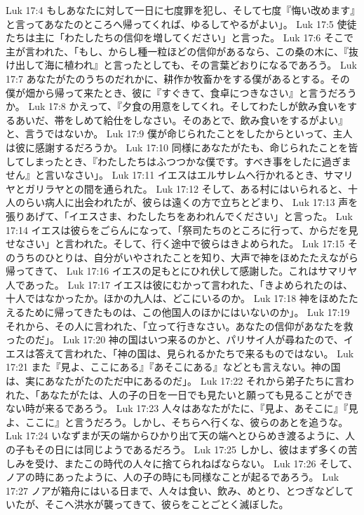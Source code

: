 Luk 17:4  もしあなたに対して一日に七度罪を犯し、そして七度『悔い改めます』と言ってあなたのところへ帰ってくれば、ゆるしてやるがよい」。
Luk 17:5  使徒たちは主に「わたしたちの信仰を増してください」と言った。
Luk 17:6  そこで主が言われた、「もし、からし種一粒ほどの信仰があるなら、この桑の木に、『抜け出して海に植われ』と言ったとしても、その言葉どおりになるであろう。
Luk 17:7  あなたがたのうちのだれかに、耕作か牧畜かをする僕があるとする。その僕が畑から帰って来たとき、彼に『すぐきて、食卓につきなさい』と言うだろうか。
Luk 17:8  かえって、『夕食の用意をしてくれ。そしてわたしが飲み食いをするあいだ、帯をしめて給仕をしなさい。そのあとで、飲み食いをするがよい』と、言うではないか。
Luk 17:9  僕が命じられたことをしたからといって、主人は彼に感謝するだろうか。
Luk 17:10  同様にあなたがたも、命じられたことを皆してしまったとき、『わたしたちはふつつかな僕です。すべき事をしたに過ぎません』と言いなさい」。
Luk 17:11  イエスはエルサレムへ行かれるとき、サマリヤとガリラヤとの間を通られた。
Luk 17:12  そして、ある村にはいられると、十人のらい病人に出会われたが、彼らは遠くの方で立ちとどまり、
Luk 17:13  声を張りあげて、「イエスさま、わたしたちをあわれんでください」と言った。
Luk 17:14  イエスは彼らをごらんになって、「祭司たちのところに行って、からだを見せなさい」と言われた。そして、行く途中で彼らはきよめられた。
Luk 17:15  そのうちのひとりは、自分がいやされたことを知り、大声で神をほめたたえながら帰ってきて、
Luk 17:16  イエスの足もとにひれ伏して感謝した。これはサマリヤ人であった。
Luk 17:17  イエスは彼にむかって言われた、「きよめられたのは、十人ではなかったか。ほかの九人は、どこにいるのか。
Luk 17:18  神をほめたたえるために帰ってきたものは、この他国人のほかにはいないのか」。
Luk 17:19  それから、その人に言われた、「立って行きなさい。あなたの信仰があなたを救ったのだ」。
Luk 17:20  神の国はいつ来るのかと、パリサイ人が尋ねたので、イエスは答えて言われた、「神の国は、見られるかたちで来るものではない。
Luk 17:21  また『見よ、ここにある』『あそこにある』などとも言えない。神の国は、実にあなたがたのただ中にあるのだ」。
Luk 17:22  それから弟子たちに言われた、「あなたがたは、人の子の日を一日でも見たいと願っても見ることができない時が来るであろう。
Luk 17:23  人々はあなたがたに、『見よ、あそこに』『見よ、ここに』と言うだろう。しかし、そちらへ行くな、彼らのあとを追うな。
Luk 17:24  いなずまが天の端からひかり出て天の端へとひらめき渡るように、人の子もその日には同じようであるだろう。
Luk 17:25  しかし、彼はまず多くの苦しみを受け、またこの時代の人々に捨てられねばならない。
Luk 17:26  そして、ノアの時にあったように、人の子の時にも同様なことが起るであろう。
Luk 17:27  ノアが箱舟にはいる日まで、人々は食い、飲み、めとり、とつぎなどしていたが、そこへ洪水が襲ってきて、彼らをことごとく滅ぼした。
